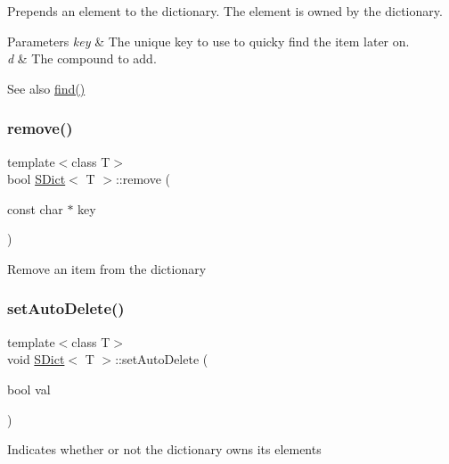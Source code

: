 Prepends an element to the dictionary. The element is owned by the dictionary. 
\begin{DoxyParams}{Parameters}
{\em key} & The unique key to use to quicky find the item later on. \\
\hline
{\em d} & The compound to add. \\
\hline
\end{DoxyParams}
\begin{DoxySeeAlso}{See also}
\mbox{\hyperlink{class_s_dict_aec67482d780157680d46f48a7ed5e7bd}{find()}} 
\end{DoxySeeAlso}
\mbox{\label{class_s_dict_ad647b04c9dff33ac0182c4d83b025c77}} 
\subsubsection{\texorpdfstring{remove()}{remove()}}
{\footnotesize\ttfamily template$<$class T$>$ \\
bool \mbox{\hyperlink{class_s_dict}{S\+Dict}}$<$ T $>$\+::remove (\begin{DoxyParamCaption}\item[{const char $\ast$}]{key }\end{DoxyParamCaption})\hspace{0.3cm}{\ttfamily [inline]}}

Remove an item from the dictionary \mbox{\label{class_s_dict_ac5ed340a2e6b4b4fb8398254cd35ef55}} 
\subsubsection{\texorpdfstring{setAutoDelete()}{setAutoDelete()}}
{\footnotesize\ttfamily template$<$class T$>$ \\
void \mbox{\hyperlink{class_s_dict}{S\+Dict}}$<$ T $>$\+::set\+Auto\+Delete (\begin{DoxyParamCaption}\item[{bool}]{val }\end{DoxyParamCaption})\hspace{0.3cm}{\ttfamily [inline]}}

Indicates whether or not the dictionary owns its elements \mbox{\label{class_s_dict_ab6da88a61ee284dfbd07830fcd63aed3}} 
